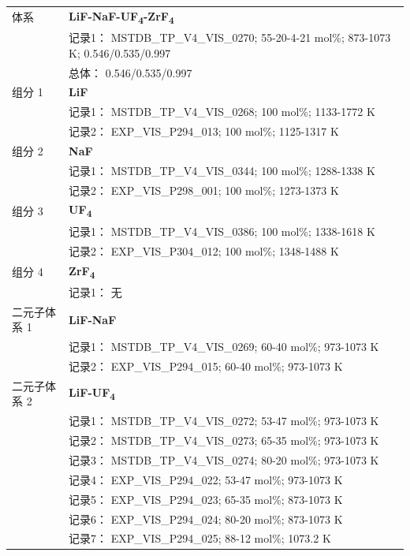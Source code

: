 \documentclass[12pt]{article}
\begin{document}
{\begin{longtable}[]{@{}
  >{\raggedright\arraybackslash}p{}
  >{\raggedright\arraybackslash}p{}@{}}
\midrule
体系 & \textbf{LiF-NaF-UF\textsubscript{4}-ZrF\textsubscript{4}} \\
 & 记录1： MSTDB\_TP\_V4\_VIS\_0270; 55-20-4-21 mol\%; 873-1073 K; 0.546/0.535/0.997 \\
 & 总体： 0.546/0.535/0.997  \\

组分 1  & \textbf{LiF} \\
 & 记录1： MSTDB\_TP\_V4\_VIS\_0268; 100 mol\%; 1133-1772 K \\
 & 记录2： EXP\_VIS\_P294\_013; 100 mol\%; 1125-1317 K  \\

组分 2  & \textbf{NaF} \\
 & 记录1： MSTDB\_TP\_V4\_VIS\_0344; 100 mol\%; 1288-1338 K \\
 & 记录2： EXP\_VIS\_P298\_001; 100 mol\%; 1273-1373 K  \\

组分 3  & \textbf{UF\textsubscript{4}} \\
 & 记录1： MSTDB\_TP\_V4\_VIS\_0386; 100 mol\%; 1338-1618 K \\
 & 记录2： EXP\_VIS\_P304\_012; 100 mol\%; 1348-1488 K  \\

组分 4 & \textbf{ZrF\textsubscript{4}} \\
 & 记录1： 无 \\
二元子体系 1  & \textbf{LiF-NaF} \\
 & 记录1： MSTDB\_TP\_V4\_VIS\_0269; 60-40 mol\%; 973-1073 K \\
 & 记录2： EXP\_VIS\_P294\_015; 60-40 mol\%; 973-1073 K  \\

二元子体系 2  & \textbf{LiF-UF\textsubscript{4}} \\
 & 记录1： MSTDB\_TP\_V4\_VIS\_0272; 53-47 mol\%; 973-1073 K \\
 & 记录2： MSTDB\_TP\_V4\_VIS\_0273; 65-35 mol\%; 973-1073 K \\
 & 记录3： MSTDB\_TP\_V4\_VIS\_0274; 80-20 mol\%; 973-1073 K \\
 & 记录4： EXP\_VIS\_P294\_022; 53-47 mol\%; 973-1073 K \\
 & 记录5： EXP\_VIS\_P294\_023; 65-35 mol\%; 873-1073 K \\
 & 记录6： EXP\_VIS\_P294\_024; 80-20 mol\%; 873-1073 K \\
 & 记录7： EXP\_VIS\_P294\_025; 88-12 mol\%; 1073.2 K  \\


\end{longtable}}
\end{document}
